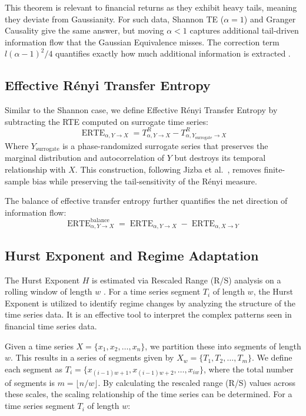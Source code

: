 \documentclass[12pt,oneside]{report}
\DeclareMathOperator{\ERTE}{ERTE}
\begin{document}
This theorem is relevant to financial returns as they exhibit heavy
tails, meaning they deviate from Gaussianity. For such data, Shannon TE
($\alpha = 1$) and Granger Causality give the same answer, but moving
$\alpha < 1$ captures additional tail-driven information flow that the
Gaussian Equivalence misses. The correction term $l(\alpha - 1)^{2}/4$
quantifies exactly how much additional information is extracted
\cite{jizba2022}.

\subsection{Effective Rényi Transfer Entropy}

Similar to the Shannon case, we define Effective Rényi Transfer Entropy
by subtracting the RTE computed on surrogate time series:
\[
  \ERTE_{\alpha, Y \rightarrow X}
    = T_{\alpha, Y \rightarrow X}^{R}
    - T_{\alpha, Y_{\text{surrogate}} \rightarrow X}^{R}
\]
Where $Y_{\text{surrogate}}$ is a phase-randomized surrogate series that
preserves the marginal distribution and autocorrelation of $Y$ but
destroys its temporal relationship with $X$. This construction,
following Jizba et al.~\cite[Eq.~49]{jizba2022}, removes finite-sample
bias while preserving the tail-sensitivity of the Rényi measure.

The balance of effective transfer entropy further quantifies the net
direction of information flow:
\[
  \ERTE_{\alpha, Y \rightarrow X}^{\text{balance}}
    = \ERTE_{\alpha, Y \rightarrow X} - \ERTE_{\alpha, X \rightarrow Y}
\]

\subsection{Hurst Exponent and Regime Adaptation}

The Hurst Exponent $H$ is estimated via Rescaled Range (R/S) analysis on
a rolling window of length $w$ \cite{hurst1951}. For a time series
segment $T_{i}$ of length $w$, the Hurst Exponent is utilized to
identify regime changes by analyzing the structure of the time series
data. It is an effective tool to interpret the complex patterns seen in
financial time series data.

Given a time series $X = \{x_{1}, x_{2}, \ldots, x_{n}\}$, we partition
these into segments of length $w$. This results in a series of segments
given by $X_{w} = \{T_{1}, T_{2}, \ldots, T_{m}\}$. We define each
segment as $T_{i} = \{x_{(i-1)w+1}, x_{(i-1)w+2}, \ldots, x_{iw}\}$,
where the total number of segments is $m = \lfloor n/w \rfloor$. By
calculating the rescaled range (R/S) values across these scales, the
scaling relationship of the time series can be determined. For a time
series segment $T_{i}$ of length $w$:
\end{document}
